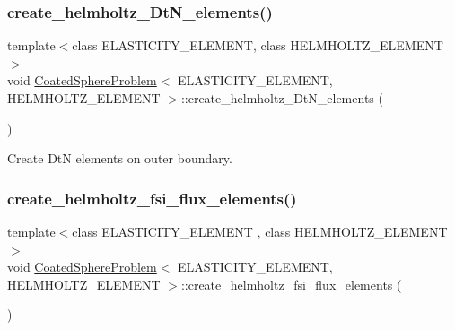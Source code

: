 \subsubsection{\texorpdfstring{create\+\_\+helmholtz\+\_\+\+Dt\+N\+\_\+elements()}{create\_helmholtz\_DtN\_elements()}\hspace{0.1cm}{\footnotesize\ttfamily [2/2]}}
{\footnotesize\ttfamily template$<$class E\+L\+A\+S\+T\+I\+C\+I\+T\+Y\+\_\+\+E\+L\+E\+M\+E\+NT, class H\+E\+L\+M\+H\+O\+L\+T\+Z\+\_\+\+E\+L\+E\+M\+E\+NT$>$ \\
void \hyperlink{classCoatedSphereProblem}{Coated\+Sphere\+Problem}$<$ E\+L\+A\+S\+T\+I\+C\+I\+T\+Y\+\_\+\+E\+L\+E\+M\+E\+NT, H\+E\+L\+M\+H\+O\+L\+T\+Z\+\_\+\+E\+L\+E\+M\+E\+NT $>$\+::create\+\_\+helmholtz\+\_\+\+Dt\+N\+\_\+elements (\begin{DoxyParamCaption}{ }\end{DoxyParamCaption})\hspace{0.3cm}{\ttfamily [private]}}



Create DtN elements on outer boundary. 

\mbox{\label{classCoatedSphereProblem_a9a301689052eefd53552aadc23ff893b}} 
\subsubsection{\texorpdfstring{create\+\_\+helmholtz\+\_\+fsi\+\_\+flux\+\_\+elements()}{create\_helmholtz\_fsi\_flux\_elements()}\hspace{0.1cm}{\footnotesize\ttfamily [1/2]}}
{\footnotesize\ttfamily template$<$class E\+L\+A\+S\+T\+I\+C\+I\+T\+Y\+\_\+\+E\+L\+E\+M\+E\+NT , class H\+E\+L\+M\+H\+O\+L\+T\+Z\+\_\+\+E\+L\+E\+M\+E\+NT $>$ \\
void \hyperlink{classCoatedSphereProblem}{Coated\+Sphere\+Problem}$<$ E\+L\+A\+S\+T\+I\+C\+I\+T\+Y\+\_\+\+E\+L\+E\+M\+E\+NT, H\+E\+L\+M\+H\+O\+L\+T\+Z\+\_\+\+E\+L\+E\+M\+E\+NT $>$\+::create\+\_\+helmholtz\+\_\+fsi\+\_\+flux\+\_\+elements (\begin{DoxyParamCaption}{ }\end{DoxyParamCaption})\hspace{0.3cm}{\ttfamily [private]}}



